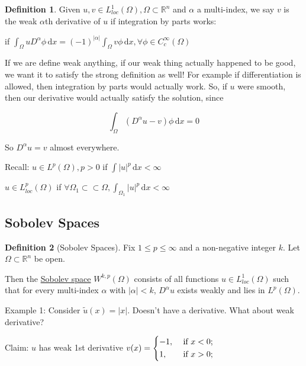 \documentclass{article}
\theoremstyle{definition}
\newtheorem{definition}{Definition}
\begin{document}
\begin{definition}
    Given \(u,v\in L_{loc}^1(\Omega), \Omega \subset \mathbb{R} ^n\) and \(\alpha \) a multi-index, we say \(v\) is the weak \(\alpha \)th derivative of \(u\) if integration by parts works:

    if \(\int_{\Omega }^{} u D^\alpha \phi \,\mathrm{d}x = (-1)^{\vert \alpha  \vert} \int_{\Omega }^{} v \phi \,\mathrm{d}x, \forall \phi \in C_c^{\infty} (\Omega)\) 
\end{definition}

If we are define weak anything, if our weak thing actually happened to be good, we want it to satisfy the strong definition as well! For example if differentiation is allowed, then integration by parts would actually work. So, if \(u\) were smooth, then our derivative would actually satisfy the solution, since

\[
    \int_{\Omega }^{} (D^\alpha u - v) \phi \,\mathrm{d}x = 0
\]

So \(D^\alpha u = v\) almost everywhere. 

Recall: \(u\in L^p(\Omega), p > 0\) if \(\int \vert u \vert ^p \,\mathrm{d} x < \infty\) 

\(u\in L^p_{loc}(\Omega)\) if \(\forall \Omega_1 \subset \subset \Omega, \int _{\Omega _1}\vert u \vert ^p \, \mathrm{d} x < \infty \) 

\subsection*{Sobolev Spaces}

\begin{definition}
    [Sobolev Spaces] Fix \(1 \leq p \leq \infty\) and a non-negative integer \(k\). Let \(\Omega \subset \mathbb{R} ^n\) be open.

    Then the \underline{Sobolev space} \(W^{k,p}(\Omega)\) consists of all functions \(u\in L^1_{loc}(\Omega)\) such that for every multi-index \(\alpha\) with \(\vert \alpha  \vert < k\), \(D^\alpha u\) exists weakly and lies in \(L^p(\Omega)\).
\end{definition}

Example 1: Consider \(\tilde{u}(x) = \vert x \vert \). Doesn't have a derivative. What about weak derivative?

Claim: \(u\) has weak 1st derivative \(v(x) = \begin{dcases}
    -1, &\text{ if } x < 0 ;\\
    1, &\text{ if } x > 0 ;\\
\end{dcases}\) 
\end{document}
